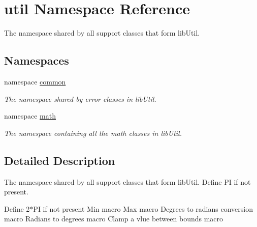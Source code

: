 \hypertarget{namespaceutil}{\section{util \-Namespace \-Reference}
\label{namespaceutil}
}


\-The namespace shared by all support classes that form lib\-Util.  


\subsection*{\-Namespaces}
\begin{DoxyCompactItemize}
\item 
namespace \hyperlink{namespaceutil_1_1common}{common}
\begin{DoxyCompactList}\small\item\em \-The namespace shared by error classes in lib\-Util. \end{DoxyCompactList}\item 
namespace \hyperlink{namespaceutil_1_1math}{math}
\begin{DoxyCompactList}\small\item\em \-The namespace containing all the math classes in lib\-Util. \end{DoxyCompactList}\end{DoxyCompactItemize}


\subsection{\-Detailed \-Description}
\-The namespace shared by all support classes that form lib\-Util. \-Define \-P\-I if not present.

\-Define 2$\ast$\-P\-I if not present \-Min macro \-Max macro \-Degrees to radians conversion macro \-Radians to degrees macro \-Clamp a vlue between bounds macro 